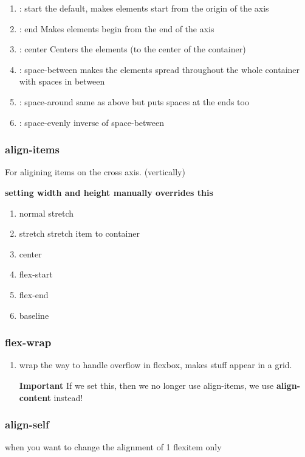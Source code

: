 \documentclass[11pt]{article}
\begin{document}
\begin{enumerate}
\item : start
\label{sec:orgdb35914}
the default, makes elements start from the origin of the axis
\item : end
\label{sec:org9c9b7ab}
Makes elements begin from the end of the axis
\item : center
\label{sec:orgd150ae6}
Centers the elements (to the center of the container)
\item : space-between
\label{sec:org5105a5e}
makes the elements spread throughout the whole container with spaces in between
\item : space-around
\label{sec:orgc689ab0}
same as above but puts spaces at the ends too
\item : space-evenly
\label{sec:org0940d27}
inverse of space-between
\end{enumerate}
\subsubsection{align-items}
\label{sec:org1de7976}
For aligining items on the cross axis. (vertically)

\textbf{setting width and height manually overrides this}
\begin{enumerate}
\item normal
\label{sec:org467eadf}
stretch
\item stretch
\label{sec:orgadb53a6}
stretch item to container
\item center
\label{sec:org79c4fe3}
\item flex-start
\label{sec:orgbd162ec}
\item flex-end
\label{sec:org608c1eb}
\item baseline
\label{sec:orgde231fd}
\end{enumerate}
\subsubsection{flex-wrap}
\label{sec:orga242baf}
\begin{enumerate}
\item wrap
\label{sec:org10e3ede}
the way to handle overflow in flexbox, makes stuff appear in a grid.

\textbf{Important} If we set this, then we no longer use align-items, we use \textbf{align-content} instead!
\end{enumerate}
\subsubsection{align-self}
\label{sec:org83ad0bd}
when you want to change the alignment of 1 flexitem only
\end{document}
